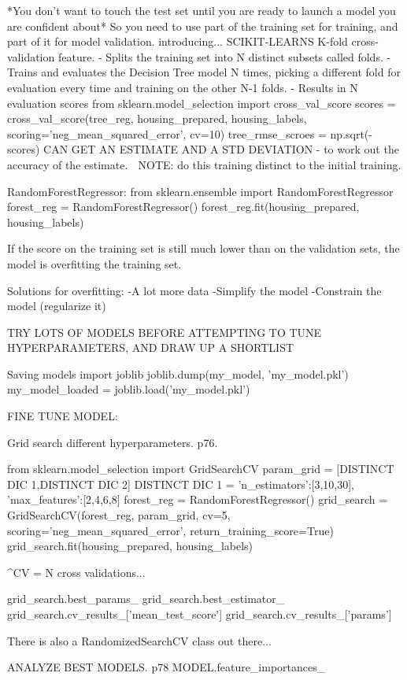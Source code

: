 *You don't want to touch the test set until you are ready to launch a model you are confident about*
So you need to use part of the training set for training, and part of it for model validation.
introducing...
SCIKIT-LEARNS K-fold cross-validation feature.
- Splits the training set into N distinct subsets called folds.
- Trains and evaluates the Decision Tree model N times, picking a different fold for evaluation every time and training on the other N-1 folds.
- Results in N evaluation scores
from sklearn.model_selection import cross_val_score
scores = cross_val_score(tree_reg, housing_prepared, housing_labels, scoring='neg_mean_squared_error', cv=10)
tree_rmse_scroes = np.sqrt(-scores)
CAN GET AN ESTIMATE AND A STD DEVIATION - to work out the accuracy of the estimate.
^^^
NOTE: do this training distinct to the initial training.


RandomForestRegressor:
from sklearn.ensemble import RandomForestRegressor
forest_reg = RandomForestRegressor()
forest_reg.fit(housing_prepared, housing_labels)

If the score on the training set is still much lower than on the validation sets,
the model is overfitting the training set.

Solutions for overfitting:
-A lot more data
-Simplify the model
-Constrain the model (regularize it)

TRY LOTS OF MODELS BEFORE ATTEMPTING TO TUNE HYPERPARAMETERS,
AND DRAW UP A SHORTLIST

Saving models
import joblib
joblib.dump(my_model, 'my_model.pkl')
my_model_loaded = joblib.load('my_model.pkl')

FINE TUNE MODEL:

Grid search different hyperparameters. p76.

from sklearn.model_selection import GridSearchCV
param_grid = [{DISTINCT DIC 1},{DISTINCT DIC 2}]
DISTINCT DIC 1 = {'n_estimators':[3,10,30], 'max_features':[2,4,6,8]}
forest_reg = RandomForestRegressor()
grid_search = GridSearchCV(forest_reg, param_grid, cv=5, scoring='neg_mean_squared_error', return_training_score=True)
grid_search.fit(housing_prepared, housing_labels)

^CV = N cross validations...

grid_search.best_params_
grid_search.best_estimator_
grid_search.cv_results_['mean_test_score']
grid_search.cv_results_['params']

There is also a RandomizedSearchCV class out there...

ANALYZE BEST MODELS. p78
MODEL.feature_importances_

